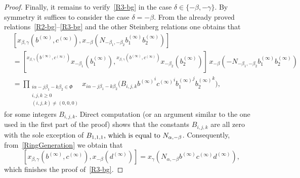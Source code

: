 \documentclass[oneside, 11pt]{amsart}
\numberwithin{equation}{section}
\theoremstyle{definition}
\theoremstyle{remark}
\newcommand{\up}[2]{{^{#1}\!{#2}}}
\begin{document}
\begin{proof}
 Finally, it remains to verify~\eqref{R3-bg} in the case $\delta \in \{-\beta, -\gamma\}$.
 By symmetry it suffices to consider the case $\delta = -\beta$.
 From the already proved relations~\eqref{R2-bg}--\eqref{R3-bg} and the other Steinberg relations one obtains that
 \begin{align*}
  &[x_{\beta, \gamma}(b^{(\infty)}, c^{(\infty)}),
  x_{-\beta}(N_{-\beta_1, -\beta_2} b_1^{(\infty)} b_2^{(\infty)})] \\
  &= [\up{x_{\beta, \gamma}(b^{(\infty)}, c^{(\infty)})}
   {x_{-\beta_1}(b_1^{(\infty)})},
  \up{x_{\beta, \gamma}(b^{(\infty)}, c^{(\infty)})}
   {x_{-\beta_2}(b_2^{(\infty)})}]\,
  x_{-\beta}(-N_{-\beta_1, -\beta_2} b_1^{(\infty)} b_2^{(\infty)})\\
  &= \prod_{\substack{i\alpha - j\beta_1 - k\beta_2 \in \Phi\\ i, j, k \geq 0\\ (i, j, k) \neq (0, 0, 0)}}
  x_{i\alpha - j\beta_1 - k\beta_2}\bigl(B_{i, j, k} {b^{(\infty)}}^i {c^{(\infty)}}^i {b_1^{(\infty)}}^j {b_2^{(\infty)}}^k\bigr),  
 \end{align*}
for some integers $B_{i,j,k}$.
Direct computation (or an argument similar to the one used in the first part of the proof) shows that the constants \(B_{i, j, k}\) are all zero with the sole exception of \(B_{1, 1, 1}$, which is equal to $N_{\alpha, -\beta}\). Consequently, from~\cref{RingGeneration} we obtain that
 \[[x_{\beta, \gamma}(b^{(\infty)}, c^{(\infty)}), x_{-\beta}(d^{(\infty)})] = x_\gamma(N_{\alpha, -\beta} b^{(\infty)} c^{(\infty)} d^{(\infty)}),\]
which finishes the proof of~\eqref{R3-bg}.
\end{proof}
\end{document}
